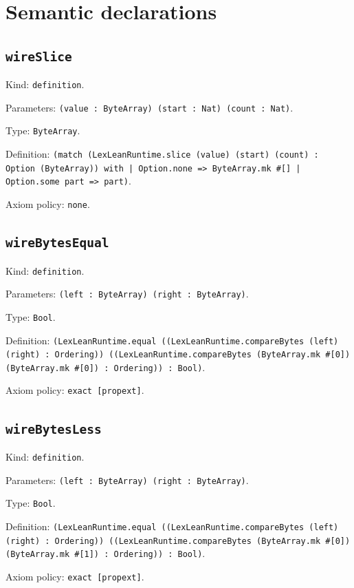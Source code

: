 \documentclass[11pt]{article}
\begin{document}
\section*{Semantic declarations}
\subsection*{\texttt{wireSlice}}
\noindent Kind: \texttt{definition}.\par
\noindent Parameters: \texttt{(value : ByteArray) (start : Nat) (count : Nat)}.\par
\noindent Type: \texttt{ByteArray}.\par
\noindent Definition: \texttt{(match (LexLeanRuntime.slice (value) (start) (count) : Option (ByteArray)) with | Option.none => ByteArray.mk \#[] | Option.some part => part)}.\par
\noindent Axiom policy: \texttt{none}.\par
\subsection*{\texttt{wireBytesEqual}}
\noindent Kind: \texttt{definition}.\par
\noindent Parameters: \texttt{(left : ByteArray) (right : ByteArray)}.\par
\noindent Type: \texttt{Bool}.\par
\noindent Definition: \texttt{(LexLeanRuntime.equal ((LexLeanRuntime.compareBytes (left) (right) : Ordering)) ((LexLeanRuntime.compareBytes (ByteArray.mk \#[0]) (ByteArray.mk \#[0]) : Ordering)) : Bool)}.\par
\noindent Axiom policy: \texttt{exact [propext]}.\par
\subsection*{\texttt{wireBytesLess}}
\noindent Kind: \texttt{definition}.\par
\noindent Parameters: \texttt{(left : ByteArray) (right : ByteArray)}.\par
\noindent Type: \texttt{Bool}.\par
\noindent Definition: \texttt{(LexLeanRuntime.equal ((LexLeanRuntime.compareBytes (left) (right) : Ordering)) ((LexLeanRuntime.compareBytes (ByteArray.mk \#[0]) (ByteArray.mk \#[1]) : Ordering)) : Bool)}.\par
\noindent Axiom policy: \texttt{exact [propext]}.\par
\end{document}
